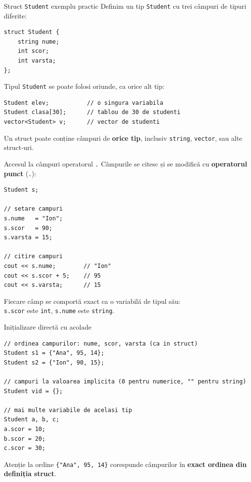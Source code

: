 ﻿\documentclass{beamer}
\begin{document}
\begin{frame}[fragile]{Struct \texttt{Student} \textemdash{} exemplu practic}
  Definim un tip \texttt{Student} cu trei câmpuri de tipuri diferite:

  \begin{lstlisting}
struct Student {
    string nume;
    int scor;
    int varsta;
};
  \end{lstlisting}

  \smallskip
  Tipul \texttt{Student} se poate folosi oriunde, ca orice alt tip:

  \begin{lstlisting}
Student elev;           // o singura variabila
Student clasa[30];      // tablou de 30 de studenti
vector<Student> v;      // vector de studenti
  \end{lstlisting}

  \smallskip
  Un struct poate conține câmpuri de \textbf{orice tip}, inclusiv
  \texttt{string}, \texttt{vector}, sau alte struct-uri.
\end{frame}

\begin{frame}[fragile]{Accesul la câmpuri \textemdash{} operatorul \texttt{.}}
  Câmpurile se citesc și se modifică cu \textbf{operatorul punct} (\texttt{.}):

  \begin{lstlisting}
Student s;

// setare campuri
s.nume   = "Ion";
s.scor   = 90;
s.varsta = 15;

// citire campuri
cout << s.nume;        // "Ion"
cout << s.scor + 5;    // 95
cout << s.varsta;      // 15
  \end{lstlisting}

  Fiecare câmp se comportă exact ca o variabilă de tipul său: \\
  \texttt{s.scor} este \texttt{int}, \texttt{s.nume} este \texttt{string}.
\end{frame}

\begin{frame}[fragile]{Inițializare directă cu acolade}
  \begin{lstlisting}
// ordinea campurilor: nume, scor, varsta (ca in struct)
Student s1 = {"Ana", 95, 14};
Student s2 = {"Ion", 90, 15};

// campuri la valoarea implicita (0 pentru numerice, "" pentru string)
Student vid = {};

// mai multe variabile de acelasi tip
Student a, b, c;
a.scor = 10;
b.scor = 20;
c.scor = 30;
  \end{lstlisting}

  \begin{alertblock}{Atenție la ordine}
    \texttt{\{"Ana", 95, 14\}} corespunde câmpurilor în \textbf{exact
    ordinea din definiția struct}.
  \end{alertblock}
\end{frame}
\end{document}
